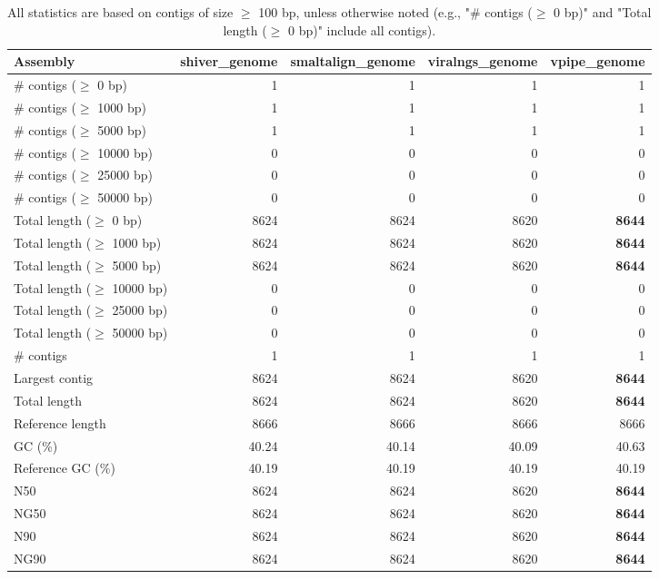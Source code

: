 \documentclass[12pt,a4paper]{article}
\begin{document}
\begin{table}[ht]
\begin{center}
\caption{All statistics are based on contigs of size $\geq$ 100 bp, unless otherwise noted (e.g., "\# contigs ($\geq$ 0 bp)" and "Total length ($\geq$ 0 bp)" include all contigs).}
\begin{tabular}{|l*{4}{|r}|}
\hline
Assembly & shiver\_genome & smaltalign\_genome & viralngs\_genome & vpipe\_genome \\ \hline
\# contigs ($\geq$ 0 bp) & 1 & 1 & 1 & 1 \\ \hline
\# contigs ($\geq$ 1000 bp) & 1 & 1 & 1 & 1 \\ \hline
\# contigs ($\geq$ 5000 bp) & 1 & 1 & 1 & 1 \\ \hline
\# contigs ($\geq$ 10000 bp) & 0 & 0 & 0 & 0 \\ \hline
\# contigs ($\geq$ 25000 bp) & 0 & 0 & 0 & 0 \\ \hline
\# contigs ($\geq$ 50000 bp) & 0 & 0 & 0 & 0 \\ \hline
Total length ($\geq$ 0 bp) & 8624 & 8624 & 8620 & {\bf 8644} \\ \hline
Total length ($\geq$ 1000 bp) & 8624 & 8624 & 8620 & {\bf 8644} \\ \hline
Total length ($\geq$ 5000 bp) & 8624 & 8624 & 8620 & {\bf 8644} \\ \hline
Total length ($\geq$ 10000 bp) & 0 & 0 & 0 & 0 \\ \hline
Total length ($\geq$ 25000 bp) & 0 & 0 & 0 & 0 \\ \hline
Total length ($\geq$ 50000 bp) & 0 & 0 & 0 & 0 \\ \hline
\# contigs & 1 & 1 & 1 & 1 \\ \hline
Largest contig & 8624 & 8624 & 8620 & {\bf 8644} \\ \hline
Total length & 8624 & 8624 & 8620 & {\bf 8644} \\ \hline
Reference length & 8666 & 8666 & 8666 & 8666 \\ \hline
GC (\%) & 40.24 & 40.14 & 40.09 & 40.63 \\ \hline
Reference GC (\%) & 40.19 & 40.19 & 40.19 & 40.19 \\ \hline
N50 & 8624 & 8624 & 8620 & {\bf 8644} \\ \hline
NG50 & 8624 & 8624 & 8620 & {\bf 8644} \\ \hline
N90 & 8624 & 8624 & 8620 & {\bf 8644} \\ \hline
NG90 & 8624 & 8624 & 8620 & {\bf 8644} \\ \hline

\end{tabular}
\end{center}
\end{table}
\end{document}
